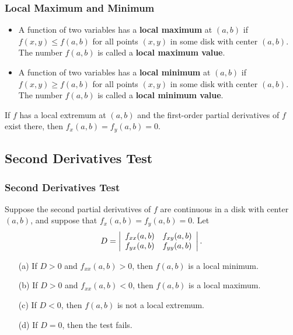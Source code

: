 \documentclass{beamer}
\begin{document}
\begin{frame}
\frametitle{Local Maximum and Minimum}

\begin{Definition}
\begin{itemize}
\item A function of two variables has a {\bf local maximum} at $(a, b)$ if $f(x, y)\leq f(a, b)$ for all points $(x, y)$ in some disk with center $(a, b)$. The number $f(a, b)$ is called a {\bf local maximum value}. 
\item A function of two variables has a {\bf local minimum} at $(a, b)$ if $f(x, y)\geq f(a, b)$ for all points $(x, y)$ in some disk with center $(a, b)$. The number $f(a, b)$ is called a {\bf local minimum value}. 
\end{itemize}
\end{Definition}

\begin{Theorem}
If $f$ has a local extremum at $(a, b)$ and the first-order partial derivatives of $f$ exist there, then $f_x(a, b) = f_y(a, b) = 0$.
\end{Theorem}

\end{frame}

\subsection{Second Derivatives Test}

\begin{frame}
\frametitle{Second Derivatives Test}
Suppose the second partial derivatives of $f$ are continuous in a disk with center $(a, b)$, and suppose that $f_x(a, b) = f_y(a, b) = 0$. Let
$$
D = \left|\begin{array}{c c} f_{xx}(a, b)	&	f_{xy}(a, b)\\ f_{yx}(a, b)	&	f_{yy}(a, b)\end{array}\right|.
$$
\begin{enumerate}
\item[(a)] If $D >0$ and $f_{xx} (a, b) > 0$, then $f(a,b)$ is a local minimum.
\item[(b)] If $D > 0$ and $f_{xx}(a, b) < 0$, then $f(a, b)$ is a local maximum.
\item[(c)] If $D < 0$, then $f(a, b)$ is not a local extremum.
\item[(d)] If $D = 0$, then the test fails.
\end{enumerate}

\end{frame}
\end{document}

